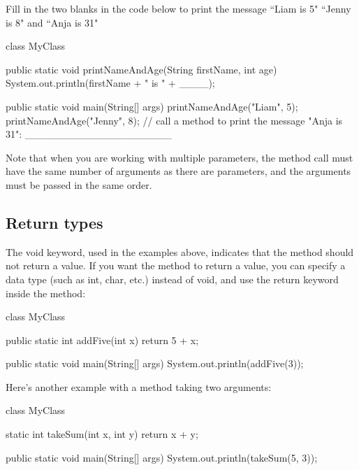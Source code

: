 \begin{example}

Fill in the two blanks in the code below to print the message ``Liam is 5" ``Jenny is 8" and ``Anja is 31"
\begin{code}
class MyClass {
  public static void printNameAndAge(String firstName, int age) {
    System.out.println(firstName + " is " + ____);
  }

  public static void main(String[] args) {
    printNameAndAge("Liam", 5);
    printNameAndAge("Jenny", 8);
    // call a method to print the message "Anja is 31":
    ____________________ 
  }
}
\end{code}
\end{example}

 Note that when you are working with multiple parameters, the method call must have the same number of arguments as there are parameters, and the arguments must be passed in the same order.

\subsection{Return types}
The void keyword, used in the examples above, indicates that the method should not return a value. If you want the method to return a value, you can specify a data type (such as int, char, etc.) instead of void, and use the return keyword inside the method: 

\begin{code}
class MyClass {
  public static int addFive(int x) {
    return 5 + x;
  }

  public static void main(String[] args) {
    System.out.println(addFive(3));
  }
}
\end{code}

Here's another example with a method taking two arguments:

\begin{code}
class MyClass {
  static int takeSum(int x, int y) {
    return x + y;
  }

  public static void main(String[] args) {
    System.out.println(takeSum(5, 3));
  }
}
\end{code}



